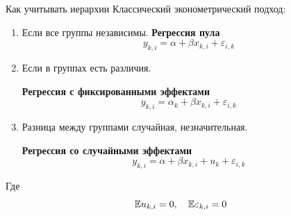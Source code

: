 \documentclass{beamer}
\begin{document}
\begin{frame}{Как учитывать иерархии}
Классический эконометрический подход:
    \begin{enumerate}
        \item Если все группы независимы. \textbf{Регрессия пула}
\begin{equation*}
    y_{k,i} = \alpha + \beta x_{k,i} + \varepsilon_{i,k}
\end{equation*}
        \item Если в группах есть различия. 
        
        \textbf{Регрессия с фиксированными эффектами}
\begin{equation*}
    y_{k,i} = \alpha_{k} + \beta x_{k,i} + \varepsilon_{i,k}
\end{equation*}
        \item Разница между группами случайная, незначительная. 
        
        \textbf{Регрессия со случайными эффектами}
\begin{equation*}
    y_{k,i} = \alpha + \beta x_{k,i} + u_{k} + \varepsilon_{i,k}
\end{equation*}
    \end{enumerate}
Где
\begin{equation*}
    \mathbb{E} u_{k,i} = 0,\quad \mathbb{E} \varepsilon_{k,i} = 0
\end{equation*}
\end{frame}
\end{document}
